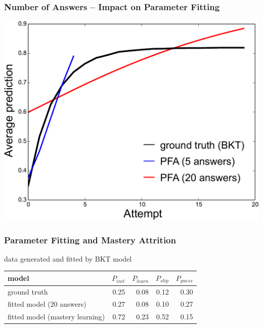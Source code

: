 \documentclass[bigger]{beamer}
\begin{document}
\begin{frame}
  \frametitle{Number of Answers -- Impact on Parameter Fitting}
  
  
  \begin{center}
    \includegraphics[width=.75\linewidth]{B1-PFA-trace-lengths}
  \end{center}
\end{frame}

\newcommand{\pinit}{P_\mathit{init}}
\newcommand{\plearn}{P_\mathit{learn}}
\newcommand{\pguess}{P_\mathit{guess}}
\newcommand{\pslip}{P_\mathit{slip}}

\begin{frame}
  \frametitle{Parameter Fitting and Mastery Attrition}

  data generated and fitted by BKT model

  \bigskip

  \begin{center}
    \begin{tabular}{lrrrr}
      \toprule
      model & $\pinit$ & $\plearn$ & $\pslip$ & $\pguess$ \\
      \midrule
      ground truth & 0.25 & 0.08 & 0.12 & 0.30 \\
      fitted model (20 answers) & 0.27 & 0.08 & 0.10 & 0.27 \\
      fitted model (mastery learning) &  0.72 & 0.23 & 0.52 & 0.15 \\
      \bottomrule   
    \end{tabular}
  \end{center}
\end{frame}
\end{document}
